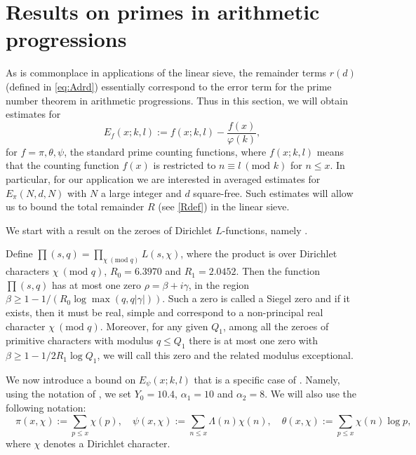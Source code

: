 \documentclass[12pt]{amsart}
\begin{document}
\section{Results on primes in arithmetic progressions}
\label{sec:PNT}
As is commonplace in applications of the linear sieve, the remainder terms $r(d)$ (defined in \eqref{eq:Adrd}) essentially correspond to the error term for the prime number theorem in arithmetic progressions. Thus in this section, we will obtain estimates for
\begin{equation} \label{eq: E_f(x;k,l)}
    E_f(x;k,l):=f(x;k,l)-\frac{f(x)}{\varphi(k)},
\end{equation}
for $f=\pi, \theta, \psi$, the standard prime counting functions, where $f(x;k,l)$ means that the counting function $f(x)$ is restricted to $n \equiv l\: (\text{mod }k)$ for $n \le x$. In particular, for our application we are interested in averaged estimates for $E_\pi(N,d,N)$ with $N$ a large integer and $d$ square-free. Such estimates will allow us to bound the total remainder $R$ (see \eqref{Rdef}) in the linear sieve. 

We start with a result on the zeroes of Dirichlet $L$-functions, namely \cite[Theorem 1.1 \& 1.3]{Kadiri}.
\begin{theorem}[Kadiri]
\label{theo:kadiri}
Define $\prod (s,q)=\prod_{\chi\: (\text{mod }q)} L(s,\chi)$, where the product is over Dirichlet characters $\chi\: (\text{mod }q)$, $R_0=6.3970$ and $R_1=2.0452$. Then the function $\prod(s,q)$ has at most one zero $\rho=\beta+i \gamma$, in the region $\beta \ge 1-1/\left(R_0\log \max \left( q,q\left|\gamma\right|\right)\right)$. Such a zero is called a Siegel zero and if it exists, then it must be real, simple and correspond to a non-principal real character $\chi\: (\text{mod }q)$. Moreover, for any given $Q_1$, among all the zeroes of primitive characters with modulus $q \le Q_1$ there is at most one zero with $\beta \ge 1-1/2R_1 \log Q_1$, we will call this zero and the related modulus exceptional.
\end{theorem}

We now introduce a bound on $E_{\psi}(x;k,l)$ that is a specific case of \cite[Theorem 1.2, Table 6]{Bordignon4}. Namely, using the notation of \cite{Bordignon4}, we set $Y_0=10.4$, $\alpha_1=10$ and $\alpha_2=8$. We will also use the following notation:
\begin{equation} \label{eq: f(x,chi)}
    \quad \pi(x, \chi) := \sum_{p \le x} \chi(p),\quad \psi(x, \chi) := \sum_{n \le x} \Lambda(n) \chi(n), \quad \theta(x, \chi) := \sum_{p \le x} \chi(n) \log p, 
\end{equation}
where $\chi$ denotes a Dirichlet character.
\end{document}

